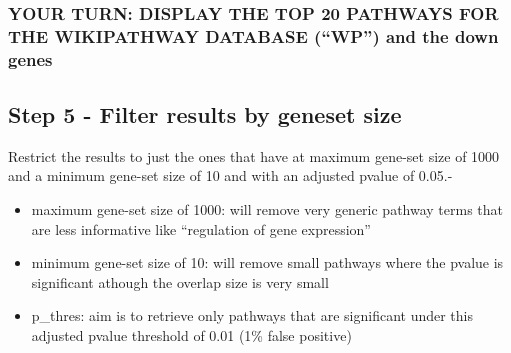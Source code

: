 \documentclass[
]{book}
\newenvironment{Shaded}{\begin{snugshade}}{\end{snugshade}}
\newcommand{\AttributeTok}[1]{\textcolor[rgb]{0.13,0.29,0.53}{#1}}
\newcommand{\DecValTok}[1]{\textcolor[rgb]{0.00,0.00,0.81}{#1}}
\newcommand{\DocumentationTok}[1]{\textcolor[rgb]{0.56,0.35,0.01}{\textbf{\textit{#1}}}}
\newcommand{\FunctionTok}[1]{\textcolor[rgb]{0.13,0.29,0.53}{\textbf{#1}}}
\newcommand{\NormalTok}[1]{#1}
\newcommand{\OtherTok}[1]{\textcolor[rgb]{0.56,0.35,0.01}{#1}}
\newcommand{\SpecialCharTok}[1]{\textcolor[rgb]{0.81,0.36,0.00}{\textbf{#1}}}
\newcommand{\StringTok}[1]{\textcolor[rgb]{0.31,0.60,0.02}{#1}}
\providecommand{\tightlist}{%
  \setlength{\itemsep}{0pt}\setlength{\parskip}{0pt}}
\begin{document}
\subsubsection{YOUR TURN: DISPLAY THE TOP 20 PATHWAYS FOR THE WIKIPATHWAY DATABASE (``WP'') and the down genes}\label{your-turn-display-the-top-20-pathways-for-the-wikipathway-database-wp-and-the-down-genes}

\begin{Shaded}
\end{Shaded}

\subsection{Step 5 - Filter results by geneset size}\label{step-5---filter-results-by-geneset-size}

Restrict the results to just the ones that have at maximum gene-set size of 1000 and a minimum gene-set size of 10 and with an adjusted pvalue of 0.05.-

\begin{itemize}
\tightlist
\item
  maximum gene-set size of 1000: will remove very generic pathway terms that are less informative like ``regulation of gene expression''
\item
  minimum gene-set size of 10: will remove small pathways where the pvalue is significant athough the overlap size is very small
\item
  p\_thres: aim is to retrieve only pathways that are significant under this adjusted pvalue threshold of 0.01 (1\% false positive)
\end{itemize}
\end{document}
